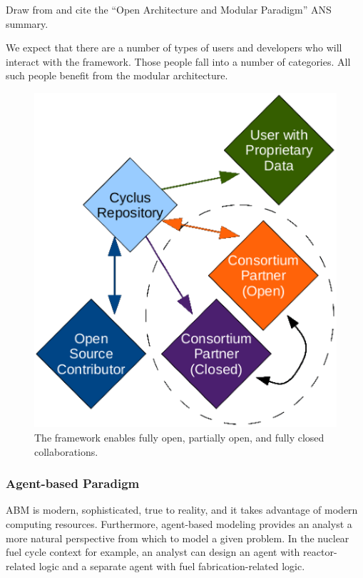 Draw from and cite the ``Open Architecture and Modular Paradigm'' ANS summary.

We expect that there are a number of types of users and developers who will 
interact with the \Cyclus framework. Those people fall into a number of 
categories. All such people benefit from the modular architecture. 

\begin{figure}[htbp!]
\begin{center}
\includegraphics{./images/modifiedopen.eps}
\end{center}
\caption{The \Cyclus framework enables fully open, partially open, and fully 
closed collaborations.}
\label{fig:modifiedopen}
\end{figure}

\subsubsection{Agent-based Paradigm}

\gls{ABM} is modern, sophisticated, true to reality, and it takes advantage of modern
computing resources. Furthermore, agent-based modeling provides an analyst a
more natural perspective from which to model a given problem. In the nuclear
fuel cycle context for example, an analyst can design an agent with
reactor-related logic and a separate agent with fuel fabrication-related logic.


